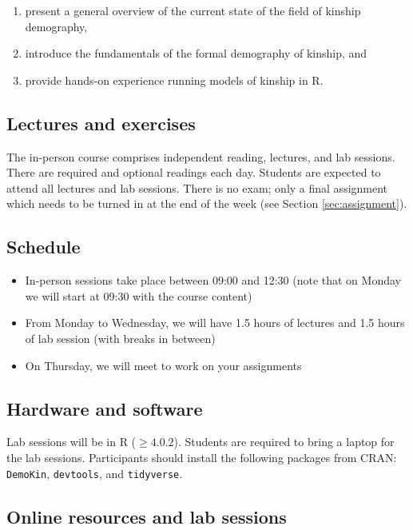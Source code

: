 \documentclass{article}
\begin{document}
\begin{enumerate}
    \item present a general overview of the current state of the field of kinship demography,
    \item introduce the fundamentals of the formal demography of kinship, and
    \item provide hands-on experience running models of kinship in R.
\end{enumerate}

\subsection{Lectures and exercises}

The in-person course comprises independent reading, lectures, and lab sessions. There are required and optional readings each day. Students are expected to attend all lectures and lab sessions. There is no exam; only a final assignment which needs to be turned in at the end of the week (see Section \ref{sec:assignment}).  

\subsection*{Schedule}

\begin{itemize}
    \item In-person sessions take place between 09:00 and 12:30 (note that on Monday we will start at 09:30 with the course content)
    \item From Monday to Wednesday, we will have 1.5 hours of lectures and 1.5 hours of lab session (with breaks in between)
    \item On Thursday, we will meet to work on your assignments 
\end{itemize}

\subsection{Hardware and software}

Lab sessions will be in R ($\geq4.0.2$). 
Students are required to bring a laptop for the lab sessions. 
Participants should install the following packages from CRAN:  \texttt{DemoKin}, \texttt{devtools}, and \texttt{tidyverse}.

\subsection{Online resources and lab sessions}
\end{document}

